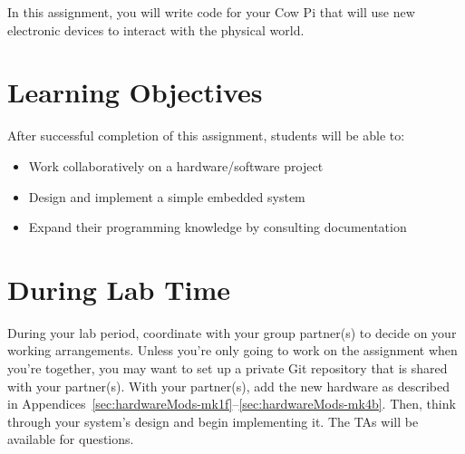 In this assignment, you will write code for your Cow Pi that will use new electronic devices to interact with the physical world.


\tableofcontents

\section*{Learning Objectives}

After successful completion of this assignment, students will be able to:
\begin{itemize}
    \item Work collaboratively on a hardware/software project
    \item Design and implement a simple embedded system
    \item Expand their programming knowledge by consulting documentation
\end{itemize}

\section*{During Lab Time}

During your lab period, coordinate with your group partner(s) to decide on your working arrangements.
Unless you're only going to work on the assignment when you're together, you may want to set up a private Git repository that is shared with your partner(s).
With your partner(s), add the new hardware as described in Appendices~\ref{sec:hardwareMods-mk1f}--\ref{sec:hardwareMods-mk4b}.
Then, think through your system's design and begin implementing it.
The TAs will be available for questions.
